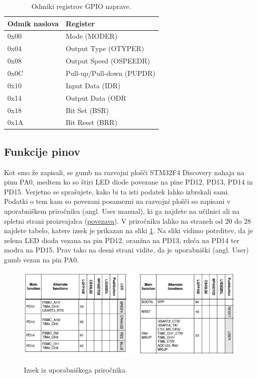 \documentclass[12pt,letterpaper]{article}
\begin{document}
\begin{table}[ht!]
    \caption{Odmiki registrov GPIO naprave.}
    \centering
        \begin{tabular}{|l|l|}
            \hline
            Odmik naslova & Register                  \\ \hline
            0x00          & Mode (MODER)              \\ \hline
            0x04          & Output Type (OTYPER)      \\ \hline
            0x08          & Output Speed (OSPEEDR)    \\ \hline
            0x0C          & Pull-up/Pull-down (PUPDR) \\ \hline
            0x10          & Input Data (IDR)          \\ \hline
            0x14          & Output Data (ODR          \\ \hline
            0x18          & Bit Set (BSR)             \\ \hline
            0x1A          & Bit Reset (BRR)           \\ \hline
        \end{tabular}
    \label{nasloviRegistrov}
\end{table}

\subsection*{Funkcije pinov}

Kot smo že zapisali, se gumb na razvojni plošči STM32F4 Discovery nahaja na pinu PA0, medtem ko so štiri LED diode povezane na pine PD12, PD13, PD14 in PD15. Verjetno se sprašujete, kako bi ta isti podatek lahko izbrskali sami. Podatki o tem kam so povezani posamezni na razvojni plošči so zapisani v uporabniškem priročniku (angl. User manual), ki ga najdete na učilnici ali na spletni strani proizvajalca (\href{https://www.st.com/content/ccc/resource/technical/document/user_manual/70/fe/4a/3f/e7/e1/4f/7d/DM00039084.pdf/files/DM00039084.pdf/jcr:content/translations/en.DM00039084.pdf}{povezava}). V priročniku lahko na straneh od 20 do 28 najdete tabelo, katere izsek je prikazan na sliki \ref{usermanualpini}. Na sliki vidimo potrditev, da je zelena LED dioda vezana na pin PD12, oranžna na PD13, rdeča na PD14 ter modra na PD15. Prav tako na desni strani vidite, da je uporabniški (angl. User) gumb vezan na pin PA0.

\begin{figure}[ht!]
  \centering
  \caption{Izsek iz uporabniškega priročnika.}
  \includegraphics[width=350pt]{images/vaja3/usermanualpins.JPG}
  \label{usermanualpini}
\end{figure}
\end{document}
